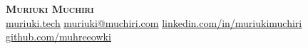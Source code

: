 \begin{center}
    \textbf{\Huge \scshape Muriuki Muchiri} \\ \vspace{1pt}
    \href{https://www.muriuki.tech} { \underline{muriuki.tech}} \quad
    \href{mailto:muriuki@muchiri.com}{ \underline{muriuki@muchiri.com}} \quad
    \href{https://www.linkedin.com/in/muriukimuchiri/}{ \underline{linkedin.com/in/muriukimuchiri}} \quad
    \href{https://github.com/muhreeowki}{ \underline{github.com/muhreeowki}}
    
\end{center}

